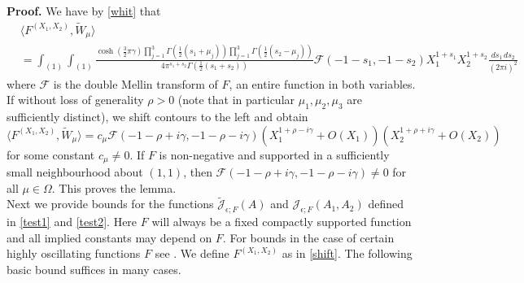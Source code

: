 \documentclass[11pt]{amsart}
\theoremstyle{plain}
\numberwithin{equation}{section}
\theoremstyle{definition}
\begin{document}
   
 \textbf{Proof.}  We have by \eqref{whit} that
\begin{displaymath}
\begin{split}  
 &   \langle F^{(X_1, X_2)}, \tilde{W}_{\mu} \rangle\\
    & =   \int_{(1)} \int_{(1)} \frac{\cosh(\frac{3}{2} \pi \gamma)\prod_{j=1}^3 \Gamma(\frac{1}{2}(s_1 + \mu_j)) \prod_{j=1}^3 \Gamma(\frac{1}{2}(s_2 - \mu_j)) }{4\pi^{s_1+s_2 } \Gamma(\frac{1}{2}(s_1+s_2))} \mathcal{F}(-1-s_1, -1-s_2) X_1^{1+s_1} X_2^{1+s_2} \frac{ds_1\, ds_2 }{(2\pi i)^2}
    \end{split}
    \end{displaymath}
where $\mathcal{F}$ is the double Mellin transform of $F$, an entire function in both variables.  If  without loss of generality $\rho > 0$ (note that in particular $\mu_1, \mu_2, \mu_3$ are sufficiently distinct), we shift contours to the left and obtain
$$  \langle F^{(X_1, X_2)}, \tilde{W}_{\mu} \rangle = c_{\mu} \mathcal{F}(-1-\rho + i\gamma, - 1 - \rho - i\gamma) (X_1^{1+\rho - i\gamma}  + O(X_1)) (X_2^{1+\rho + i\gamma} + O(X_2))$$
for some constant $c_{\mu} \not= 0$. If $F$ is non-negative and supported in a sufficiently small   neighbourhood about $(1, 1)$, then $\mathcal{F}(-1-\rho + i\gamma, - 1 - \rho - i\gamma) \not= 0$ for all $\mu \in \Omega$. This proves the lemma.\\




Next we provide bounds for the functions  $\tilde{\mathcal{J}}_{\epsilon;F}(A)$ and $ \mathcal{J}_{\epsilon;F} (A_1, A_2)$ defined in \eqref{test1} and \eqref{test2}. Here $F$ will always be a fixed compactly supported function and all implied constants may depend on $F$. For bounds in the case of certain highly oscillating functions $F$ see \cite[Proposition 5]{Bl}. We define $F^{(X_1, X_2)}$ as in \eqref{shift}. The following basic bound suffices in many cases. 
\end{document}
